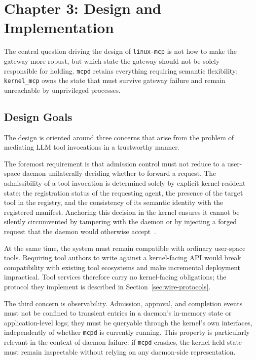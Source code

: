 \section*{Chapter 3: Design and Implementation}
 \label{chap:design} \setcounter{section}{3} \setcounter{subsection}{0}

The central question driving the design of \texttt{linux-mcp} is not how to make the gateway more robust, but which state the gateway should not be solely responsible for holding.
\texttt{mcpd} retains everything requiring semantic flexibility; \texttt{kernel\_mcp} owns the state that must survive gateway failure and remain unreachable by unprivileged processes.



\subsection{Design Goals}

The design is oriented around three concerns that arise from the problem of mediating LLM tool invocations in a trustworthy manner.

The foremost requirement is that admission control must not reduce to a user-space daemon unilaterally deciding whether to forward a request.
The admissibility of a tool invocation is determined solely by explicit kernel-resident state: the registration status of the requesting agent, the presence of the target tool in the registry, and the consistency of its semantic identity with the registered manifest.
Anchoring this decision in the kernel ensures it cannot be silently circumvented by tampering with the daemon or by injecting a forged request that the daemon would otherwise accept~\cite{chen2016shreds, brimhall2023mac}.

At the same time, the system must remain compatible with ordinary user-space tools.
Requiring tool authors to write against a kernel-facing API would break compatibility with existing tool ecosystems and make incremental deployment impractical.
Tool services therefore carry no kernel-facing obligations; the protocol they implement is described in Section~\ref{sec:wire-protocols}.

The third concern is observability.
Admission, approval, and completion events must not be confined to transient entries in a daemon's in-memory state or application-level logs; they must be queryable through the kernel's own interfaces, independently of whether \texttt{mcpd} is currently running.
This property is particularly relevant in the context of daemon failure: if \texttt{mcpd} crashes, the kernel-held state must remain inspectable without relying on any daemon-side representation.

